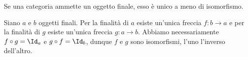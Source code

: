 \begin{Theorem}\label{unicita_finale}
	Se una categoria ammette un oggetto finale, esso \`e unico a meno di isomorfismo.
\end{Theorem}
\Proof Siano $a$ e $b$ oggetti finali. Per la finalit\`a di $a$ esiste un'unica freccia $f: b \rightarrow a$ e per la finalit\`a di $g$ esiste un'unica freccia $g: a \rightarrow b$. Abbiamo necessariamente $f \circ g = \Id_a$ e $g \circ f = \Id_b$, dunque $f$ e $g$ sono isomorfismi, l'uno l'inverso dell'altro. \EndProof
